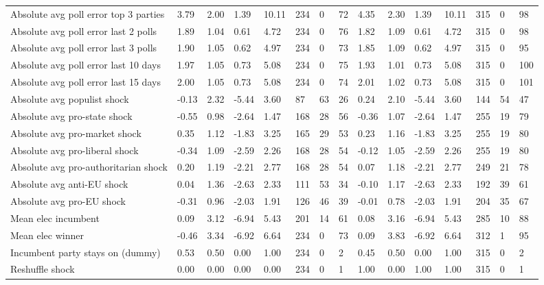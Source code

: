 \begin{longtable}{lllllllllllllll}
Absolute avg poll error top 3 parties & 3.79 & 2.00 & 1.39 & 10.11 & 234 & 0 & 72 & 4.35 & 2.30 & 1.39 & 10.11 & 315 & 0 & 98\\
\addlinespace
Absolute avg poll error last 2 polls & 1.89 & 1.04 & 0.61 & 4.72 & 234 & 0 & 76 & 1.82 & 1.09 & 0.61 & 4.72 & 315 & 0 & 98\\
Absolute avg poll error last 3 polls & 1.90 & 1.05 & 0.62 & 4.97 & 234 & 0 & 73 & 1.85 & 1.09 & 0.62 & 4.97 & 315 & 0 & 95\\
Absolute avg poll error last 10 days & 1.97 & 1.05 & 0.73 & 5.08 & 234 & 0 & 75 & 1.93 & 1.01 & 0.73 & 5.08 & 315 & 0 & 100\\
Absolute avg poll error last 15 days & 2.00 & 1.05 & 0.73 & 5.08 & 234 & 0 & 74 & 2.01 & 1.02 & 0.73 & 5.08 & 315 & 0 & 101\\
Absolute avg populist shock & -0.13 & 2.32 & -5.44 & 3.60 & 87 & 63 & 26 & 0.24 & 2.10 & -5.44 & 3.60 & 144 & 54 & 47\\
\addlinespace
Absolute avg pro-state shock & -0.55 & 0.98 & -2.64 & 1.47 & 168 & 28 & 56 & -0.36 & 1.07 & -2.64 & 1.47 & 255 & 19 & 79\\
Absolute avg pro-market shock & 0.35 & 1.12 & -1.83 & 3.25 & 165 & 29 & 53 & 0.23 & 1.16 & -1.83 & 3.25 & 255 & 19 & 80\\
Absolute avg pro-liberal shock & -0.34 & 1.09 & -2.59 & 2.26 & 168 & 28 & 54 & -0.12 & 1.05 & -2.59 & 2.26 & 255 & 19 & 80\\
Absolute avg pro-authoritarian shock & 0.20 & 1.19 & -2.21 & 2.77 & 168 & 28 & 54 & 0.07 & 1.18 & -2.21 & 2.77 & 249 & 21 & 78\\
Absolute avg anti-EU shock & 0.04 & 1.36 & -2.63 & 2.33 & 111 & 53 & 34 & -0.10 & 1.17 & -2.63 & 2.33 & 192 & 39 & 61\\
\addlinespace
Absolute avg pro-EU shock & -0.31 & 0.96 & -2.03 & 1.91 & 126 & 46 & 39 & -0.01 & 0.78 & -2.03 & 1.91 & 204 & 35 & 67\\
Mean elec incumbent & 0.09 & 3.12 & -6.94 & 5.43 & 201 & 14 & 61 & 0.08 & 3.16 & -6.94 & 5.43 & 285 & 10 & 88\\
Mean elec winner & -0.46 & 3.34 & -6.92 & 6.64 & 234 & 0 & 73 & 0.09 & 3.83 & -6.92 & 6.64 & 312 & 1 & 95\\
Incumbent party stays on (dummy) & 0.53 & 0.50 & 0.00 & 1.00 & 234 & 0 & 2 & 0.45 & 0.50 & 0.00 & 1.00 & 315 & 0 & 2\\
Reshuffle shock & 0.00 & 0.00 & 0.00 & 0.00 & 234 & 0 & 1 & 1.00 & 0.00 & 1.00 & 1.00 & 315 & 0 & 1\\

\end{longtable}
